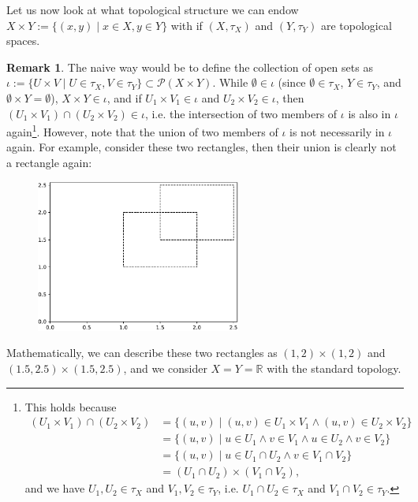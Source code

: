 \documentclass[12pt, a4paper]{article}
\numberwithin{equation}{section}
\theoremstyle{definition}
\theoremstyle{definition}
\newtheorem{remark}[thm]{Remark} %
\begin{document}
		Let us now look at what topological structure we can endow $X\times Y := \{ (x, y) \mid x\in X, y\in Y \}$ with if $(X, \tau_X)$ and $(Y, \tau_Y)$ are topological spaces.
		
		\begin{remark}
			The naive way would be to define the collection of open sets as $\iota := \{ U\times V \mid U\in\tau_X, V\in\tau_Y \}\subset \mathcal P(X\times Y)$. While $\emptyset\in\iota$ (since $\emptyset\in \tau_X$, $Y\in \tau_Y$, and $\emptyset\times Y = \emptyset$), $X\times Y \in \iota$, and if $U_1\times V_1\in \iota$ and $U_2\times V_2\in\iota$, then $(U_1\times V_1) \cap (U_2\times V_2)\in\iota$, i.e. the intersection of two members of $\iota$ is also in $\iota$ again\footnote{This holds because 
				\begin{align*}
					(U_1 \times V_1) \cap (U_2\times V_2) &= \{(u, v) \mid (u, v)\in U_1\times V_1 \wedge (u, v)\in U_2\times V_2 \} \\ &= \{(u, v) \mid u\in U_1\wedge v\in V_1\wedge u\in U_2\wedge v\in V_2\}
					\\ &= \{(u, v)\mid u\in U_1\cap U_2 \wedge v\in V_1\cap V_2\}
					\\ &= (U_1\cap U_2) \times (V_1\cap V_2),
				\end{align*}
				and we have $U_1, U_2\in\tau_X$ and $V_1, V_2\in\tau_Y$, i.e. $U_1\cap U_2\in\tau_X$ and $V_1\cap V_2\in \tau_Y$.
			}. However, note that the union of two members of $\iota$ is not necessarily in $\iota$ again. For example, consider these two rectangles, then their union is clearly not a rectangle again:
			\begin{figure}[h!]
				\centering 
				\includegraphics[width=0.6\textwidth]{scripts/rectangles.pdf}
			\end{figure}
			
			Mathematically, we can describe these two rectangles as $(1, 2) \times (1, 2)$ and $(1.5, 2.5) \times (1.5, 2.5)$, and we consider $X = Y = \mathbb R$ with the standard topology.
		\end{remark}
		
\end{document}
